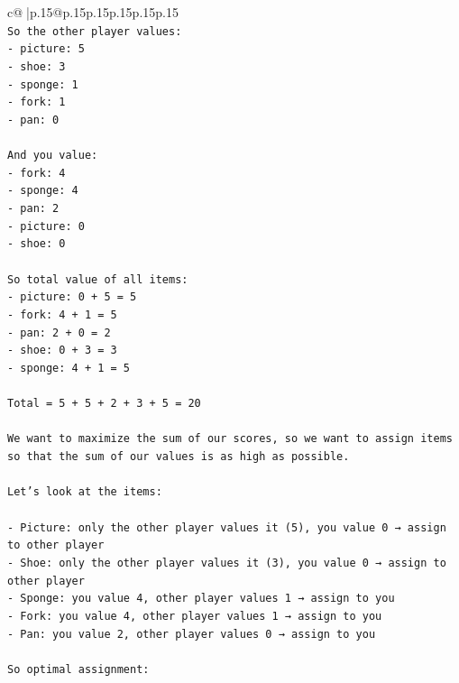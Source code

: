 \documentclass{article}
\begin{document}
{\begin{supertabular}{c@{$\;$}|p{.15\linewidth}@{}p{.15\linewidth}p{.15\linewidth}p{.15\linewidth}p{.15\linewidth}p{.15\linewidth}}
{{{\\ 
\texttt{So the other player values:  } \\
\texttt{{-} picture: 5  } \\
\texttt{{-} shoe: 3  } \\
\texttt{{-} sponge: 1  } \\
\texttt{{-} fork: 1  } \\
\texttt{{-} pan: 0} \\
\\ 
\texttt{And you value:  } \\
\texttt{{-} fork: 4  } \\
\texttt{{-} sponge: 4  } \\
\texttt{{-} pan: 2  } \\
\texttt{{-} picture: 0  } \\
\texttt{{-} shoe: 0} \\
\\ 
\texttt{So total value of all items:  } \\
\texttt{{-} picture: 0 + 5 = 5  } \\
\texttt{{-} fork: 4 + 1 = 5  } \\
\texttt{{-} pan: 2 + 0 = 2  } \\
\texttt{{-} shoe: 0 + 3 = 3  } \\
\texttt{{-} sponge: 4 + 1 = 5} \\
\\ 
\texttt{Total = 5 + 5 + 2 + 3 + 5 = 20} \\
\\ 
\texttt{We want to maximize the sum of our scores, so we want to assign items so that the sum of our values is as high as possible.} \\
\\ 
\texttt{Let’s look at the items:} \\
\\ 
\texttt{{-} Picture: only the other player values it (5), you value 0 → assign to other player  } \\
\texttt{{-} Shoe: only the other player values it (3), you value 0 → assign to other player  } \\
\texttt{{-} Sponge: you value 4, other player values 1 → assign to you  } \\
\texttt{{-} Fork: you value 4, other player values 1 → assign to you  } \\
\texttt{{-} Pan: you value 2, other player values 0 → assign to you} \\
\\ 
\texttt{So optimal assignment:  } \\
}}}
\end{supertabular}}
\end{document}
